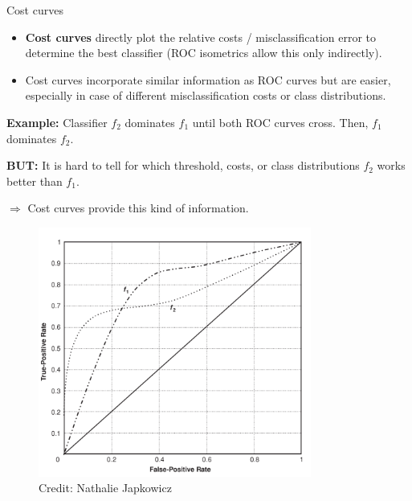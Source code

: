 







\begin{vbframe}{Cost curves}

\begin{itemize}
  \item \textbf{Cost curves} directly plot the relative costs / misclassification error to determine the best classifier (ROC isometrics allow this only indirectly).
  \item Cost curves incorporate similar information as ROC curves but are easier, especially in case of different misclassification costs or class distributions. %
\end{itemize}
\vspace{-0.1cm}
\begin{minipage}{0.5\textwidth}
\textbf{Example:} Classifier $f_2$ dominates $f_1$ until both ROC curves cross. Then, $f_1$ dominates $f_2$.

\textbf{BUT:} It is hard to tell for which threshold, costs, or class distributions $f_2$ works better than $f_1$.

$\Rightarrow$ Cost curves provide this kind of information.
\end{minipage}
\begin{minipage}{0.49\textwidth}

\begin{figure}
    \centering
    \includegraphics[width=0.8\textwidth]{figure_man/cost-curves-1.png}
    \tiny{\\ Credit: Nathalie Japkowicz  \\}
\end{figure}




\end{minipage}
\end{vbframe}
